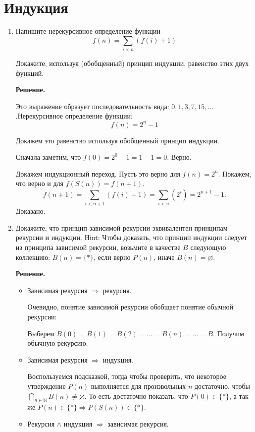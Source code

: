 \section*{Индукция}
\begin{enumerate}

\item Напишите нерекурсивное определение функции
\[ f(n) = \sum_{i < n} (f(i) + 1) \]

Докажите, используя (обобщенный) принцип индукции, равенство этих двух функций.

\textbf{Решение.} 

Это выражение образует последовательность вида: $0, 1, 3, 7, 15,...$ .Нерекурсивное 
определение функции: 
\begin{equation*}
f(n) = 2^n - 1
\end{equation*}

Докажем это равенство используя обобщенный принцип индукции.

Сначала заметим, что $f(0) = 2^0 - 1 = 1 - 1 = 0$. Верно.

Докажем индукционный переход. Пусть это верно для $f(n) = 2^n$. Покажем, что верно и для 
$f(S(n)) = f(n + 1)$.
\begin{equation*}
f(n + 1) = \sum_{i < n + 1} (f(i) + 1) = \sum_{i<n}(2^i) = 2^{n + 1} - 1.
\end{equation*}
Доказано.

\item Докажите, что принцип зависимой рекурсии эквивалентен принципам рекурсии и индукции.
    Hint: Чтобы доказать, что принцип индукции следует из принципа зависимой рекурсии, возьмите 
    в качестве $B$ следующую коллекцию:
    $B(n) = \{ * \}$, если верно $P(n)$, иначе $B(n) = \varnothing$.
    
\textbf{Решение.}

\begin{itemize}
	\item Зависимая рекурсия $\Rightarrow$ рекурсия.
	
	Очевидно, понятие зависимой рекурсии обобщает понятие обычной рекурсии:
	
	Выберем $B(0) = B(1) = B(2) = \ldots = B(n) = \ldots = B$. Получим обычную рекурсию.
	
	\item Зависимая рекурсия $\Rightarrow$ индукция.
	
	Воспользуемся подсказкой, тогда чтобы проверить, что некоторое утверждение $P(n)$ выполняется для 
	произвольных $n$ достаточно, чтобы $\bigcap\limits_{n\in \mathbb{N}} B(n) \neq \varnothing$. То есть достаточно 
	показать, что $P(0)\in \{*\}$, а так же $P(n) \in \{*\} \Rightarrow P(S(n)) \in \{*\}$.
	\item Рекурсия $\wedge$ индукция $\Rightarrow$ зависимая рекурсия.
	

\end{itemize}
\end{enumerate}
